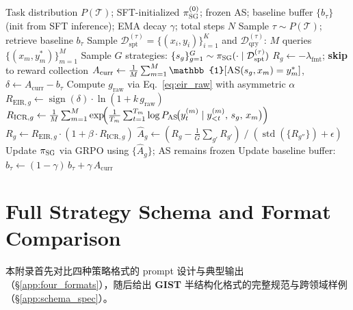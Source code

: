 \documentclass[11pt]{article}
\newcommand{\gist}{\textbf{GIST}}
\newcommand{\mist}{\textbf{GIST}}  %
\newcommand{\sg}{\textnormal{\textsc{SG}}}
\newcommand{\as}{\textnormal{\textsc{AS}}}
\begin{document}
\begin{algorithm}[H]
\caption{\gist{} Training (Phase 2: Inductive Alignment)}
\label{alg:mist}
\begin{algorithmic}[1]
\Require Task distribution $P(\mathcal{T})$; SFT-initialized $\pi_{\sg{}}^{(0)}$; frozen \as{}; baseline buffer $\{b_\tau\}$ (init from SFT inference); EMA decay $\gamma$; total steps $N$
  \State Sample $\tau \sim P(\mathcal{T})$; retrieve baseline $b_\tau$
  \State Sample $\mathcal{D}_\text{spt}^{(\tau)} = \{(x_i,y_i)\}_{i=1}^K$ and $\mathcal{D}_\text{qry}^{(\tau)}$: $M$ queries $\{(x_m, y^*_m)\}_{m=1}^M$
  \State Sample $G$ strategies: $\{s_g\}_{g=1}^G \sim \pi_{\sg{}}(\cdot \mid \mathcal{D}_\text{spt}^{(\tau)})$
     $R_g \leftarrow -\lambda_\text{fmt}$; \textbf{skip} to reward collection \EndIf
    \State $A_\text{curr} \leftarrow \tfrac{1}{M}\sum_{m=1}^M \mathbb{1}[\as{}(s_g, x_m) = y^*_m]$,\quad $\delta \leftarrow A_\text{curr} - b_\tau$ 
    \State Compute $g_\text{raw}$ via Eq.~\eqref{eq:eir_raw} with asymmetric $\alpha$
    \State $R_{\text{EIR},g} \leftarrow \operatorname{sign}(\delta) \cdot \ln(1 + k\,g_\text{raw})$ 
    \State $R_{\text{ICR},g} \leftarrow \tfrac{1}{M}\sum_{m=1}^{M}\exp\!\Bigl(\tfrac{1}{T_m}\sum_{t=1}^{T_m}\log P_\text{AS}\!\bigl(y_t^{(m)} \mid y_{<t}^{(m)},\, s_g,\, x_m\bigr)\Bigr)$ 
    \State $R_g \leftarrow R_{\text{EIR},g} \cdot (1 + \beta \cdot R_{\text{ICR},g})$ 
  \EndFor
  \State $\hat{A}_g \leftarrow (R_g - \tfrac{1}{G}\sum_{g'} R_{g'}) \;/\; (\operatorname{std}(\{R_{g''}\}) + \epsilon)$ 
  \State Update $\pi_{\sg{}}$ via GRPO using $\{\hat{A}_g\}$; \as{} remains frozen
  \State Update baseline buffer: $b_\tau \leftarrow (1-\gamma)\,b_\tau + \gamma\,A_\text{curr}$
\EndFor
\end{algorithmic}
\end{algorithm}

\section{Full Strategy Schema and Format Comparison}
\label{app:schema}

本附录首先对比四种策略格式的 prompt 设计与典型输出（§\ref{app:four_formats}），随后给出 \mist{} 半结构化格式的完整规范与跨领域样例（§\ref{app:schema_spec}）。

\end{document}
